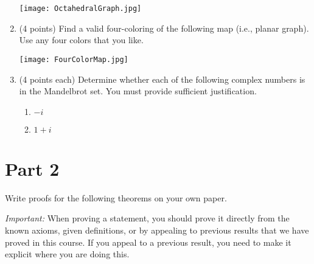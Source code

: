 \documentclass[11pt]{article}
\theoremstyle{definition}
\begin{document}
\begin{enumerate}
\begin{center}
\texttt{[image: OctahedralGraph.jpg]}
\end{center}

\item (4 points) Find a valid four-coloring of the following map (i.e., planar graph).  Use any four colors that you like.

\begin{center}
\texttt{[image: FourColorMap.jpg]}
\end{center}

\item (4 points each)  Determine whether each of the following complex numbers is in the Mandelbrot set.  You must provide sufficient justification.

\begin{enumerate}
\item $-i$
\item $1+i$
\end{enumerate}

\end{enumerate}

\section*{Part 2}

Write proofs for the following theorems on your own paper.

\bigskip

\emph{Important:} When proving a statement, you should prove it directly from the known axioms, given definitions, or by appealing to previous results that we have proved in this course.  If you appeal to a previous result, you need to make it explicit where you are doing this.
\end{document}
